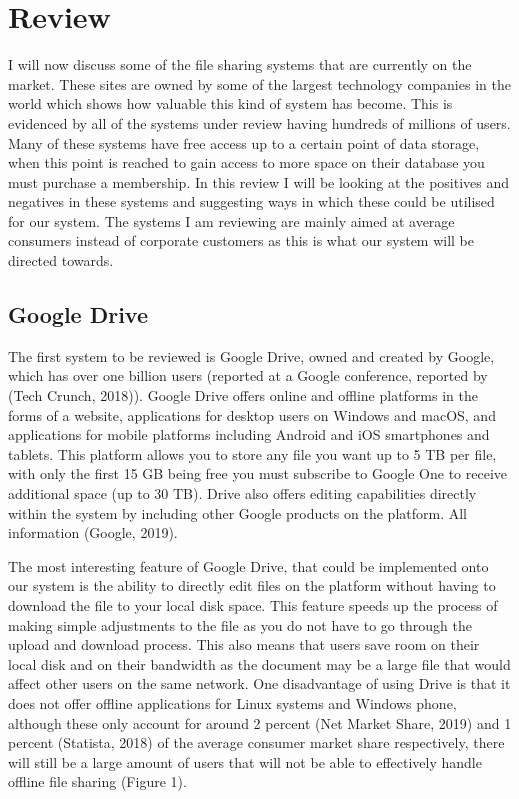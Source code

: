 \documentclass[11pt]{article}
\begin{document}
\section{Review}

I will now discuss some of the file sharing systems that are currently on the market. These sites are owned by some of the largest technology companies in the world which shows how valuable this kind of system has become. This is evidenced by all of the systems under review having hundreds of millions of users. Many of these systems have free access up to a certain point of data storage, when this point is reached to gain access to more space on their database you must purchase a membership. In this review I will be looking at the positives and negatives in these systems and suggesting ways in which these could be utilised for our system. The systems I am reviewing are mainly aimed at average consumers instead of corporate customers as this is what our system will be directed towards.

\subsection{Google Drive}

The first system to be reviewed is Google Drive, owned and created by Google, which has over one billion users (reported at a Google conference, reported by (Tech Crunch, 2018)). Google Drive offers online and offline platforms in the forms of a website, applications for desktop users on Windows and macOS, and applications for mobile platforms including Android and iOS smartphones and tablets. This platform allows you to store any file you want up to 5 TB per file, with only the first 15 GB being free you must subscribe to Google One to receive additional space (up to 30 TB). Drive also offers editing capabilities directly within the system by including other Google products on the platform. All information (Google, 2019). 

The most interesting feature of Google Drive, that could be implemented onto our system is the ability to directly edit files on the platform without having to download the file to your local disk space. This feature speeds up the process of making simple adjustments to the file as you do not have to go through the upload and download process. This also means that users save room on their local disk and on their bandwidth as the document may be a large file that would affect other users on the same network. One disadvantage of using Drive is that it does not offer offline applications for Linux systems and Windows phone, although these only account for around 2 percent (Net Market Share, 2019) and 1 percent (Statista, 2018) of the average consumer market share respectively, there will still be a large amount of users that will not be able to effectively handle offline file sharing (Figure 1).
\end{document}
